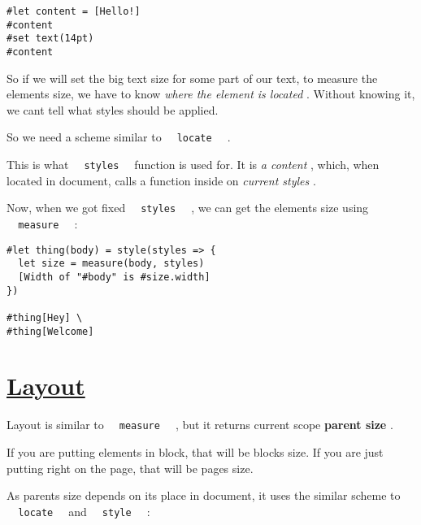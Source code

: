 \begin{verbatim}
#let content = [Hello!]
#content
#set text(14pt)
#content
\end{verbatim}

\pandocbounded{}

So if we will set the big text size for some part of our text, to
measure the element\textquotesingle s size, we have to know \emph{where
the element is located} . Without knowing it, we can\textquotesingle t
tell what styles should be applied.

So we need a scheme similar to
\texttt{\ }{\texttt{\ locate\ }}\texttt{\ } .

This is what \texttt{\ }{\texttt{\ styles\ }}\texttt{\ } function is
used for. It is \emph{a content} , which, when located in document,
calls a function inside on \emph{current styles} .

Now, when we got fixed \texttt{\ }{\texttt{\ styles\ }}\texttt{\ } , we
can get the element\textquotesingle s size using
\texttt{\ }{\texttt{\ measure\ }}\texttt{\ } :

\begin{verbatim}
#let thing(body) = style(styles => {
  let size = measure(body, styles)
  [Width of "#body" is #size.width]
})

#thing[Hey] \
#thing[Welcome]
\end{verbatim}

\pandocbounded{}

\section{\texorpdfstring{\hyperref[layout]{Layout}}{Layout}}\label{layout}

Layout is similar to \texttt{\ }{\texttt{\ measure\ }}\texttt{\ } , but
it returns current scope \textbf{parent size} .

If you are putting elements in block, that will be
block\textquotesingle s size. If you are just putting right on the page,
that will be page\textquotesingle s size.

As parent\textquotesingle s size depends on it\textquotesingle s place
in document, it uses the similar scheme to
\texttt{\ }{\texttt{\ locate\ }}\texttt{\ } and
\texttt{\ }{\texttt{\ style\ }}\texttt{\ } :

